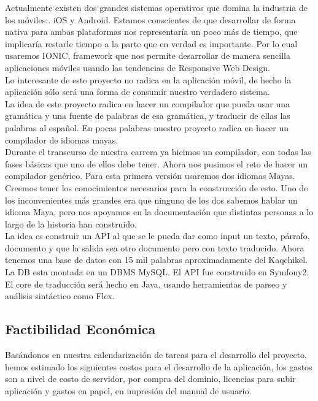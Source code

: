 \documentclass[a4paper,openright,12pt]{article}
\begin{document}
Actualmente existen dos grandes sistemas operativos que domina la industria de los m\'oviles:. iOS y Android. Estamos conscientes de que desarrollar de forma nativa para ambas plataformas nos representar\'ia un poco m\'as de tiempo, que implicar\'ia restarle tiempo a la parte que en verdad es importante. Por lo cual usaremos IONIC, framework que nos permite desarrollar de manera sencilla aplicaciones m\'oviles usando las tendencias de Responsive Web Design. \\

Lo interesante de este proyecto no radica en la aplicaci\'on m\'ovil, de hecho la aplicaci\'on s\'olo ser\'a una forma de consumir nuestro verdadero sistema.\\

La idea de este proyecto radica en hacer un compilador que pueda usar una gram\'atica y una fuente de palabras de esa gram\'atica, y traducir de ellas las palabras al español. En pocas palabras nuestro proyecto radica en hacer un compilador de idiomas mayas.\\

Durante el transcurso de nuestra carrera ya hicimos un compilador, con todas las fases b\'asicas que uno de ellos debe tener. Ahora nos pusimos el reto de hacer un compilador gen\'erico. Para esta primera versi\'on usaremos dos idiomas Mayas.\\

Creemos tener los conocimientos necesarios para la construcci\'on de esto. Uno de los inconvenientes m\'as grandes era que ninguno de los dos sabemos hablar un idioma Maya, pero nos apoyamos en la documentaci\'on que distintas personas a lo largo de la historia han construido.\\ 

La idea es construir un API al que se le pueda dar como input un texto, p\'arrafo, documento y que la salida sea otro documento pero con texto traducido. Ahora tenemos una base de datos con 15 mil palabras aproximadamente del Kaqchikel. La DB esta montada en un DBMS MySQL. El API fue construido en Symfony2.\\

El core de traducci\'on ser\'a hecho en Java,  usando herramientas de parseo y an\'alisis sint\'actico como Flex.

\subsection{Factibilidad Econ\'omica}
Bas\'andonos en nuestra calendarizaci\'on de tareas para el desarrollo del proyecto, hemos estimado los siguientes costos para el desarrollo de la aplicaci\'on, los gastos son a nivel de costo de servidor, por compra del dominio, licencias para subir aplicaci\'on y gastos en papel, en impresi\'on del manual de usuario.\\
\end{document}
